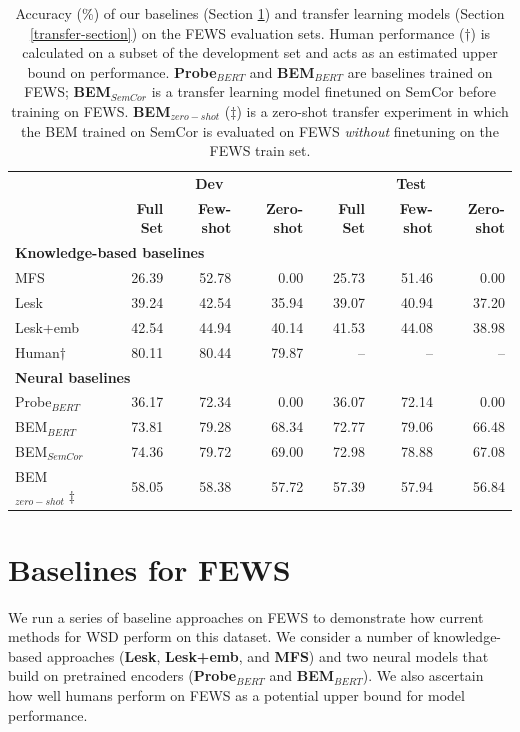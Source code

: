 \documentclass[11pt,a4paper]{article}
\begin{document}
\begin{table}[t]
    \centering
    \begin{tabular}{l | r r r | r r r} 
    \toprule
     & \multicolumn{3}{c|}{\textbf{Dev}} & \multicolumn{3}{c}{\textbf{Test}} \\
     & \textbf{Full Set}& \textbf{Few-shot} & \textbf{Zero-shot} & \textbf{Full Set} & \textbf{Few-shot} & \textbf{Zero-shot} \\
    \hline
    \hline
    \multicolumn{7}{l}{\textbf{Knowledge-based baselines}} \\
    \hline
    MFS & 26.39 & 52.78 & 0.00 & 25.73 & 51.46 & 0.00 \\
    Lesk & 39.24 & 42.54 & 35.94 & 39.07 & 40.94 & 37.20 \\
    Lesk+emb & 42.54 & 44.94 & 40.14 & 41.53 & 44.08 & 38.98 \\
    \hline
    Human$\dagger$ & 80.11 & 80.44 & 79.87 & -- & -- & -- \\
    \hline
    \hline
    \multicolumn{7}{l}{\textbf{Neural baselines}} \\ 
    \hline
    Probe$_{BERT}$ & 36.17 & 72.34 & 0.00 & 36.07 & 72.14 & 0.00 \\
    BEM$_{BERT}$ & 73.81 & 79.28 & 68.34 & 72.77 & 79.06 & 66.48 \\
     \hline
    BEM$_{SemCor}$ & 74.36 & 79.72 & 69.00 & 72.98 & 78.88 & 67.08 \\
    BEM$_{zero-shot}\ddagger$ & 58.05 &	58.38 & 57.72 &	57.39 & 57.94 & 56.84 \\
    \toprule
    \end{tabular}
    \caption{Accuracy (\%) of our baselines (Section \ref{baselines-section}) and transfer learning models (Section \ref{transfer-section}) on the FEWS evaluation sets. Human performance ($\dagger$) is calculated on a subset of the development set and acts as an estimated upper bound on performance. \textbf{Probe$_{BERT}$} and \textbf{BEM$_{BERT}$} are baselines trained on FEWS; \textbf{BEM$_{SemCor}$} is a transfer learning model finetuned on SemCor before training on FEWS.  \textbf{BEM$_{zero-shot}$} ($\ddagger$) is a zero-shot transfer experiment in which the BEM trained on SemCor is evaluated on FEWS \textit{without} finetuning on the FEWS train set.}
    \label{fews-results-table}
\end{table}

\section{Baselines for FEWS}
\label{baselines-section}
We run a series of baseline approaches on FEWS to demonstrate how current methods for WSD perform on this dataset. We consider a number of knowledge-based approaches (\textbf{Lesk}, \textbf{Lesk+emb}, and \textbf{MFS}) and two neural models that build on pretrained encoders (\textbf{Probe$_{BERT}$} and \textbf{BEM$_{BERT}$}). We also ascertain how well humans perform on FEWS as a potential upper bound for model performance.
\end{document}
